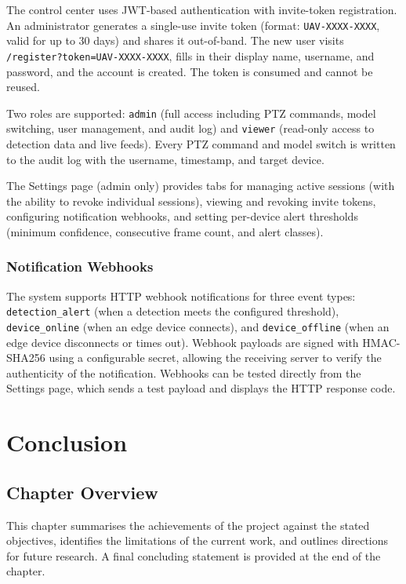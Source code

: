 \documentclass[12pt,a4paper]{report}
\begin{document}
The control center uses JWT-based authentication with invite-token registration.
An administrator generates a single-use invite token (format: \texttt{UAV-XXXX-XXXX},
valid for up to 30 days) and shares it out-of-band. The new user visits
\texttt{/register?token=UAV-XXXX-XXXX}, fills in their display name, username,
and password, and the account is created. The token is consumed and cannot be
reused.

Two roles are supported: \texttt{admin} (full access including PTZ commands,
model switching, user management, and audit log) and \texttt{viewer}
(read-only access to detection data and live feeds). Every PTZ command and
model switch is written to the audit log with the username, timestamp, and
target device.

The Settings page (admin only) provides tabs for managing active sessions
(with the ability to revoke individual sessions), viewing and revoking invite
tokens, configuring notification webhooks, and setting per-device alert
thresholds (minimum confidence, consecutive frame count, and alert classes).

\subsection{Notification Webhooks}

The system supports HTTP webhook notifications for three event types:
\texttt{detection\_alert} (when a detection meets the configured threshold),
\texttt{device\_online} (when an edge device connects), and
\texttt{device\_offline} (when an edge device disconnects or times out).
Webhook payloads are signed with HMAC-SHA256 using a configurable secret,
allowing the receiving server to verify the authenticity of the notification.
Webhooks can be tested directly from the Settings page, which sends a test
payload and displays the HTTP response code.

\chapter{Conclusion}

\section{Chapter Overview}

This chapter summarises the achievements of the project against the stated
objectives, identifies the limitations of the current work, and outlines
directions for future research. A final concluding statement is provided
at the end of the chapter.
\end{document}
